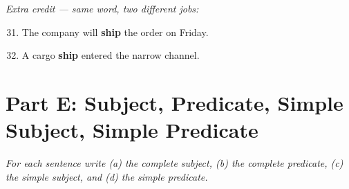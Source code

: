 \documentclass[11pt]{article}
\newcommand{\ansline}{\underline{\hspace{1.1in}}}
\begin{document}
\noindent\textit{Extra credit --- same word, two different jobs:}
\begin{enumerate}\setcounter{enumi}{30}
  \item The company will \textbf{ship} the order on Friday. \ansline
  \vspace{2pt}
  \item A cargo \textbf{ship} entered the narrow channel. \ansline
  \vspace{2pt}
\end{enumerate}

\newpage

\section*{Part E: Subject, Predicate, Simple Subject, Simple Predicate}
\noindent\textit{For each sentence write (a) the complete subject, (b) the complete predicate, (c) the simple subject, and (d) the simple predicate.}
\end{document}

